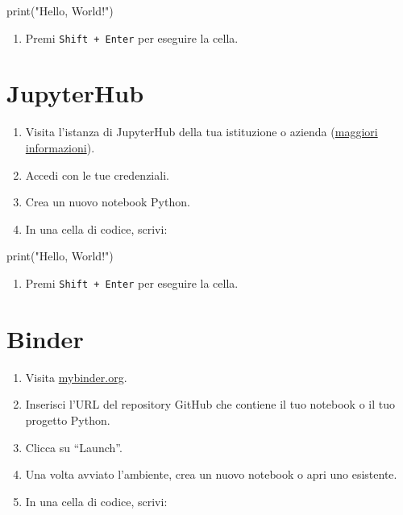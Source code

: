 \documentclass[
  letterpaper,
]{scrbook}
\newenvironment{Shaded}{\begin{snugshade}}{\end{snugshade}}
\newcommand{\BuiltInTok}[1]{\textcolor[rgb]{0.00,0.23,0.31}{#1}}
\newcommand{\NormalTok}[1]{\textcolor[rgb]{0.00,0.23,0.31}{#1}}
\newcommand{\StringTok}[1]{\textcolor[rgb]{0.13,0.47,0.30}{#1}}
\providecommand{\tightlist}{%
  \setlength{\itemsep}{0pt}\setlength{\parskip}{0pt}}\usepackage{longtable,booktabs,array}
\begin{document}
\begin{Shaded}
\begin{Highlighting}[]
\BuiltInTok{print}\NormalTok{(}\StringTok{"Hello, World!"}\NormalTok{)}
\end{Highlighting}
\end{Shaded}

\begin{enumerate}
\def\labelenumi{\arabic{enumi}.}
\setcounter{enumi}{4}
\tightlist
\item
  Premi \texttt{Shift\ +\ Enter} per eseguire la cella.
\end{enumerate}

\section{JupyterHub}

\begin{enumerate}
\def\labelenumi{\arabic{enumi}.}
\item
  Visita l'istanza di JupyterHub della tua istituzione o azienda
  (\href{https://jupyter.org/hub}{maggiori informazioni}).
\item
  Accedi con le tue credenziali.
\item
  Crea un nuovo notebook Python.
\item
  In una cella di codice, scrivi:
\end{enumerate}

\begin{Shaded}
\begin{Highlighting}[]
\BuiltInTok{print}\NormalTok{(}\StringTok{"Hello, World!"}\NormalTok{)}
\end{Highlighting}
\end{Shaded}

\begin{enumerate}
\def\labelenumi{\arabic{enumi}.}
\setcounter{enumi}{4}
\tightlist
\item
  Premi \texttt{Shift\ +\ Enter} per eseguire la cella.
\end{enumerate}

\section{Binder}

\begin{enumerate}
\def\labelenumi{\arabic{enumi}.}
\item
  Visita \href{https://mybinder.org/}{mybinder.org}.
\item
  Inserisci l'URL del repository GitHub che contiene il tuo notebook o
  il tuo progetto Python.
\item
  Clicca su ``Launch''.
\item
  Una volta avviato l'ambiente, crea un nuovo notebook o apri uno
  esistente.
\item
  In una cella di codice, scrivi:
\end{enumerate}
\end{document}
